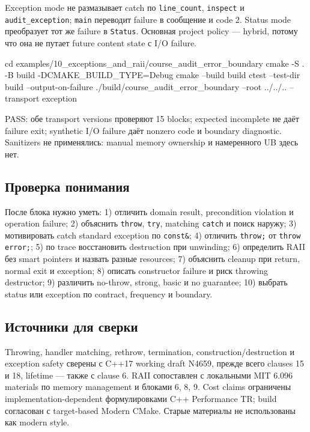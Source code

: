 Exception mode не размазывает catch по \texttt{line\_count}, \texttt{inspect} и
\texttt{audit\_exception}; \texttt{main} переводит failure в сообщение и code 2.
Status mode преобразует тот же failure в \texttt{Status}. Основная project policy
--- hybrid, потому что она не путает future content state с I/O failure.

\begin{shellcode}
cd examples/10_exceptions_and_raii/course_audit_error_boundary
cmake -S . -B build -DCMAKE_BUILD_TYPE=Debug
cmake --build build
ctest --test-dir build --output-on-failure
./build/course_audit_error_boundary --root ../../.. --transport exception
\end{shellcode}

PASS: обе transport versions проверяют 15 blocks; expected incomplete не даёт
failure exit; synthetic I/O failure даёт nonzero code и boundary diagnostic.
Sanitizers не применялись: manual memory ownership и намеренного UB здесь нет.

\subsection{Проверка понимания}

После блока нужно уметь:
1) отличить domain result, precondition violation и operation failure; 2) объяснить \texttt{throw}, \texttt{try}, matching \texttt{catch} и поиск наружу; 3) мотивировать catch standard exception по \texttt{const\&}; 4) отличить \texttt{throw;} от \texttt{throw error;}; 5) по trace восстановить destruction при unwinding; 6) определить RAII без smart pointers и назвать разные resources; 7) объяснить cleanup при return, normal exit и exception; 8) описать constructor failure и риск throwing destructor; 9) различить no-throw, strong, basic и no guarantee; 10) выбрать status или exception по contract, frequency и boundary.

\subsection{Источники для сверки}

Throwing, handler matching, rethrow, termination, construction/destruction и
exception safety сверены с C++17 working draft N4659, прежде всего clauses 15 и
18, lifetime --- также с clause 6. RAII сопоставлен с локальными MIT 6.096
materials по memory management и блоками 6, 8, 9. Cost claims ограничены
implementation-dependent формулировками C++ Performance TR; build согласован с
target-based Modern CMake. Старые материалы не использованы как modern style.
